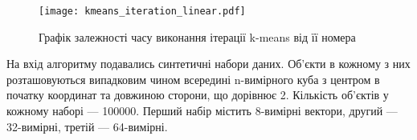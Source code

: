                 
                \begin{figure}
                    \centering
                    \texttt{[image: kmeans\_iteration\_linear.pdf]}
                    \caption{Графік залежності часу виконання ітерації k-means від її номера}\label{fig:kmeans_linear}
                \end{figure}
                
                На вхід алгоритму подавались синтетичні набори даних. Об’єкти в кожному з них розташовуються випадковим чином всередині n-вимірного куба з центром в початку координат та довжиною сторони, що дорівнює 2. Кількість об’єктів у кожному наборі --- 100000. Перший набір містить 8-вимірні вектори, другий --- 32-вимірні, третій --- 64-вимірні.
                
                
                

            
                     
